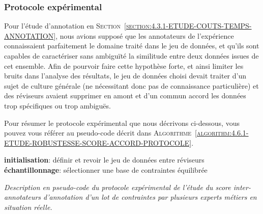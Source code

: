 		\subsubsection{Protocole expérimental}
			
			\begin{leftBarWarning}
				Pour l'étude d'annotation en \textsc{Section~\ref{section:4.3.1-ETUDE-COUTS-TEMPS-ANNOTATION}}, nous avions supposé que les annotateurs de l'expérience connaissaient parfaitement le domaine traité dans le jeu de données, et qu'ils sont capables de caractériser sans ambiguïté la similitude entre deux données issues de cet ensemble.
				Afin de pourvoir faire cette hypothèse forte, et ainsi limiter les bruits dans l'analyse des résultats, le jeu de données choisi devait traiter d'un sujet de culture générale (ne nécessitant donc pas de connaissance particulière) et des réviseurs avaient supprimer en amont et d'un commun accord les données trop spécifiques ou trop ambiguës.
			\end{leftBarWarning}
			
			Pour résumer le protocole expérimental que nous décrivons ci-dessous, vous pouvez vous référer au pseudo-code décrit dans \textsc{Algorithme~\ref{algorithm:4.6.1-ETUDE-ROBUSTESSE-SCORE-ACCORD-PROTOCOLE}}.

			\begin{algorithm}
				\textbf{initialisation}: définir et revoir le jeu de données entre réviseurs \;
				\textbf{échantillonnage}: sélectionner une base de contraintes équilibrée \;
				\caption{\textit{
					Description en pseudo-code du protocole expérimental de l'étude du score inter-annotateurs d'annotation d'un lot de contraintes par plusieurs experts métiers en situation réelle.
				}}
				\label{algorithm:4.6.1-ETUDE-ROBUSTESSE-SCORE-ACCORD-PROTOCOLE}
			\end{algorithm}
			
